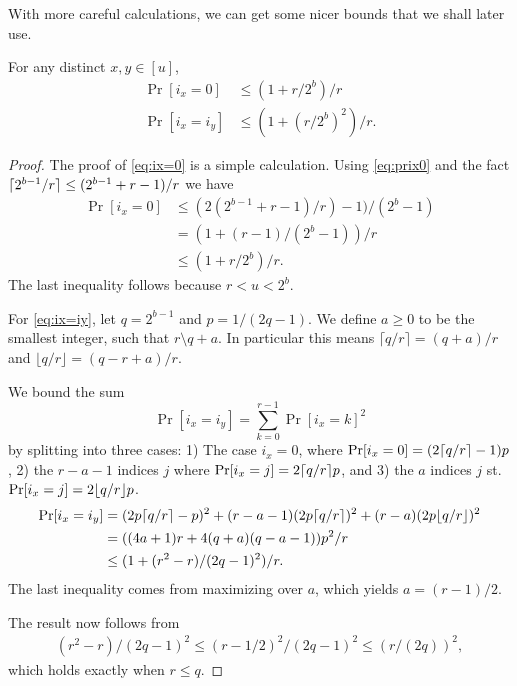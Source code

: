 With more careful calculations, we can get some nicer bounds that we shall later use.
\begin{lemma}
   \label{lem:ix-r-dist}
   For any distinct $x,y\in [u]$,
   \begin{align}
      \Pr[i_x=0] & \le(1+r/2^b)/r\label{eq:ix=0} \\ \Pr[i_x=i_y] & \leq \left(1+(r/2^b)^2\right)/r.
      \label{eq:ix=iy}
   \end{align}
\end{lemma}
\begin{proof}
   The proof of \eqref{eq:ix=0} is a simple calculation.
   Using \eqref{eq:prix0} and the fact $\lceil {2^{b-1}/r}\rceil\le(2^{b-1}+r-1)/r$ we have
   \begin{align*}
      \Pr[i_x=0] & \le (2(2^{b-1}+r-1)/r)-1)/(2^{b}-1) \\    & =\left(1+(r-1)/(2^b-1)\right)/r\\   & \le\left(1+r/2^b\right)/r.
   \end{align*}
   The last inequality follows because $r<u<2^b$.

   For \ref{eq:ix=iy}, let $q=2^{b-1}$ and $p=1/(2q-1)$.
   We define $a\ge 0$ to be the smallest integer, such that $r\setminus q+a$.
   In particular this means $\lceil q/r\rceil = (q+a)/r$ and $\lfloor q/r\rfloor = (q-r+a)/r$.

   We bound the sum $$ \Pr[i_x=i_y] = \sum_{k=0}^{r-1} \Pr[i_x = k]^2 $$ by splitting into three cases: 1) The case $i_x=0$, where $\Pr[i_x=0]=(2\lceil {q/r}\rceil-1)p$, 2) the $r-a-1$ indices $j$ where $\Pr[i_x=j]=2\lceil {q/r}\rceil p$, and 3) the $a$ indices $j$ st.
   $\Pr[i_x=j]=2\lfloor {q/r} \rfloor p$.
   \begin{align*}
      \Pr[i_x=i_y]
       & =
      (2p\lceil { q/r}\rceil-p)^2 + (r-a-1) (2p \lceil q/r\rceil)^2 + (r-a) (2p \lfloor q/r \rfloor)^2
      \\  & = ((4a+1)r+4(q+a)(q-a-1))p^2/r
      \\  & \le (1 + (r^2-r)/(2q-1)^2) / r.
   \end{align*}
   The last inequality comes from maximizing over $a$, which yields $a=(r-1)/2$.

   The result now follows from
   \begin{align}
      (r^2-r)/(2q-1)^2 \le (r-1/2)^2/(2q-1)^2 \le (r/(2q))^2,
   \end{align}
   which holds exactly when $r\le q$.

\end{proof}
